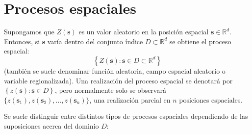 \documentclass[
  spanish,
]{book}
\theoremstyle{break}
\theoremstyle{definition}
\theoremstyle{definition}
\theoremstyle{definition}
\theoremstyle{definition}
\theoremstyle{remark}
\begin{document}
\hypertarget{proc-esp}{%
\section{Procesos espaciales}\label{proc-esp}}

Supongamos que \(Z(\mathbf{s})\) es un valor aleatorio en la posición espacial \(\mathbf{s} \in \mathbb{R}^{d}\).
Entonces, si \(\mathbf{s}\) varía dentro del conjunto índice \(D\subset \mathbb{R}^{d}\) se obtiene el proceso espacial:
\[\left\{ Z(\mathbf{s}) : \mathbf{s} \in D \subset \mathbb{R}^{d} \right\}\]
(también se suele denominar función aleatoria, campo espacial aleatorio o variable regionalizada).
Una realización del proceso espacial se denotará por \(\left\{ z(\mathbf{s}) : \mathbf{s} \in D \right\}\), pero normalmente solo se observará \(\{z(\mathbf{s}_1), z(\mathbf{s}_2), \ldots, z(\mathbf{s}_n)\}\), una realización parcial en \(n\) posiciones espaciales.

Se suele distinguir entre distintos tipos de procesos espaciales dependiendo de las suposiciones acerca del dominio \(D\):
\end{document}
